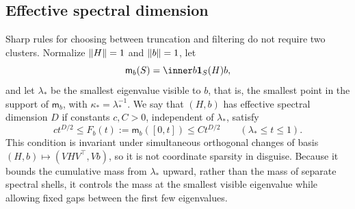 \subsection{Effective spectral dimension}
\label{sec:effective-spectral-dimension}

Sharp rules for choosing between truncation and filtering do not require
two clusters.  Normalize
$\lVert H\rVert=1$ and $\lVert b\rVert=1$, let
\begin{equation}
 \mathsf m_b(S)=\inner b{\mathbf1_S(H)b},
 \label{eq:spectral-measure}
\end{equation}
and let $\lambda_*$ be the smallest eigenvalue visible to $b$, that is, the
smallest point in the support of $\mathsf m_b$, with
$\kappa_*=\lambda_*^{-1}$.  We say that $(H,b)$ has effective spectral
dimension $D$ if constants $c,C>0$, independent of $\lambda_*$, satisfy
\begin{equation}
 c t^{D/2}\leq F_b(t):=\mathsf m_b([0,t])\leq C t^{D/2}
 \qquad(\lambda_*\leq t\leq1).
 \label{eq:effective-dimension-definition}
\end{equation}
This condition is invariant under simultaneous orthogonal changes of basis
$(H,b)\mapsto(VHV^\top,Vb)$, so it is not coordinate sparsity in disguise.
Because it bounds the cumulative mass from $\lambda_*$ upward, rather than
the mass of separate spectral shells, it controls the mass at the smallest
visible eigenvalue while allowing fixed gaps between the first few
eigenvalues.

